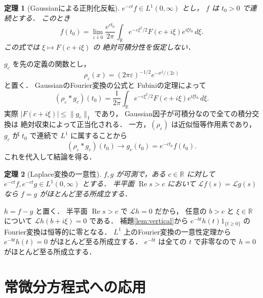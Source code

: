 \documentclass[a5paper,10pt,onecolumn]{jsarticle}
\makeatletter
\theoremstyle{mathnotetheorem}
\newtheorem{theorem}{定理}[section]
\renewcommand{\proofname}{証明}
\renewenvironment{proof}[1][\proofname]{%
  \par\pushQED{\qed}\normalfont\topsep4\p@\@plus2\p@\relax
  \trivlist\item[\hskip\labelsep\bfseries #1]\ignorespaces
}{\popQED\endtrivlist\@endpefalse}
\newcommand{\norm}[1]{\lVert #1\rVert}
\makeatother
\begin{document}
\begin{theorem}[Gaussianによる正則化反転]
\label{thm:regularized-inversion}
$e^{-ct}f\in L^1(0,\infty)$ とし，
$f$ は $t_0>0$ で連続とする．
このとき
\[
 f(t_0)=\lim_{\varepsilon\downarrow0}
 \frac{e^{ct_0}}{2\pi}\int_{\mathbb R}
 e^{-\varepsilon\xi^2/2}
 F(c+i\xi)e^{i\xi t_0}\,d\xi.
\]
この式では $\xi\mapsto F(c+i\xi)$ の
絶対可積分性を仮定しない．
\end{theorem}
\begin{proof}
$g_c$ を先の定義の関数とし，
\[
 \rho_\varepsilon(x)
 =(2\pi\varepsilon)^{-1/2}
 e^{-x^2/(2\varepsilon)}
\]
と置く．
GaussianのFourier変換の公式と
Fubiniの定理によって
\[
 (\rho_\varepsilon*g_c)(t_0)
 =\frac1{2\pi}\int_{\mathbb R}
 e^{-\varepsilon\xi^2/2}
 F(c+i\xi)e^{i\xi t_0}\,d\xi.
\]
実際 $|F(c+i\xi)|\le\norm{g_c}_1$ であり，
Gaussian因子が可積分なので全ての積分交換は
絶対収束によって正当化される．
一方，$(\rho_\varepsilon)$ は近似恒等作用素であり，
$g_c$ が $t_0$ で連続で $L^1$ に属することから
\[
 (\rho_\varepsilon*g_c)(t_0)\longrightarrow g_c(t_0)
 =e^{-ct_0}f(t_0).
\]
これを代入して結論を得る．
\end{proof}

\begin{theorem}[Laplace変換の一意性]\label{thm:uniqueness}
$f,g$ が可測で，ある $c\in\mathbb R$ に対して
$e^{-ct}f,e^{-ct}g\in L^1(0,\infty)$ とする．
半平面 $\operatorname{Re}s>c$ において
$\mathcal Lf(s)=\mathcal Lg(s)$ なら
$f=g$ がほとんど至る所成立する．
\end{theorem}
\begin{proof}
$h=f-g$ と置く．
半平面 $\operatorname{Re}s>c$ で $\mathcal Lh=0$ だから，
任意の $b>c$ と $\xi\in\mathbb R$ について
$\mathcal Lh(b+i\xi)=0$ である．
補題\ref{lem:vertical}から
$e^{-bt}h(t)1_{\{t\ge0\}}$ のFourier変換は恒等的に零となる．
$L^1$ 上のFourier変換の一意性定理から
$e^{-bt}h(t)=0$ がほとんど至る所成立する．
$e^{-bt}$ は全ての $t$ で非零なので
$h=0$ がほとんど至る所成立する．
\end{proof}

\section{常微分方程式への応用}
\end{document}
